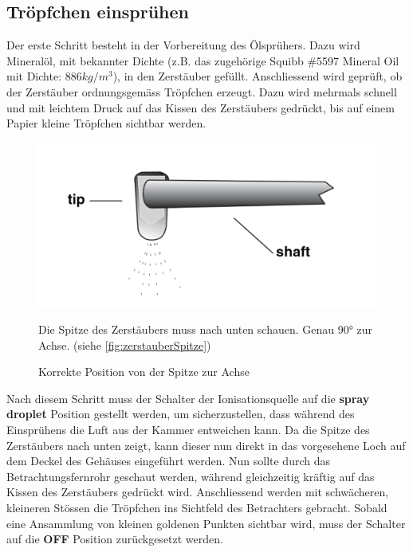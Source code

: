 \subsection{Tröpfchen einsprühen}\label{sub:tröpfchensprühen}
Der erste Schritt besteht in der Vorbereitung des Ölsprühers. Dazu wird Mineralöl, mit bekannter Dichte (z.B. das zugehörige Squibb \#5597 Mineral Oil mit Dichte: $886 kg/m^3$), in den Zerstäuber gefüllt. Anschliessend wird geprüft, ob der Zerstäuber ordnungsgemäss Tröpfchen erzeugt. Dazu wird mehrmals schnell und mit leichtem Druck auf das Kissen des Zerstäubers gedrückt, bis auf einem Papier kleine Tröpfchen sichtbar werden.
\begin{figure}[h]
	\begin{minipage}[t]{0.45\textwidth}
		\centering
		\includegraphics[width=\textwidth]{bilder/pdf/zerstauberSpitze.pdf}
		\caption{Korrekte Position von der Spitze zur Achse \parencite[7]{instructionManualHalogen}}
		\label{fig:zerstauberSpitze}
	\end{minipage}
	\hfill
	\begin{minipage}[t]{0.45\textwidth}
		Die Spitze des Zerstäubers muss nach unten schauen. Genau 90° zur Achse. (siehe \autoref{fig:zerstauberSpitze})
	\end{minipage} 
\end{figure}

Nach diesem Schritt muss der Schalter der Ionisationsquelle auf die \textbf{spray droplet} Position gestellt werden, um sicherzustellen, dass während des Einsprühens die Luft aus der Kammer entweichen kann. Da die Spitze des Zerstäubers nach unten zeigt, kann dieser nun direkt in das vorgesehene Loch auf dem Deckel des Gehäuses eingeführt werden. Nun sollte durch das Betrachtungsfernrohr geschaut werden, während gleichzeitig kräftig auf das Kissen des Zerstäubers gedrückt wird. Anschliessend werden mit schwächeren, kleineren Stössen die Tröpfchen ins Sichtfeld des Betrachters gebracht. Sobald eine Ansammlung von kleinen goldenen Punkten sichtbar wird, muss der Schalter auf die \textbf{OFF} Position zurückgesetzt werden.

